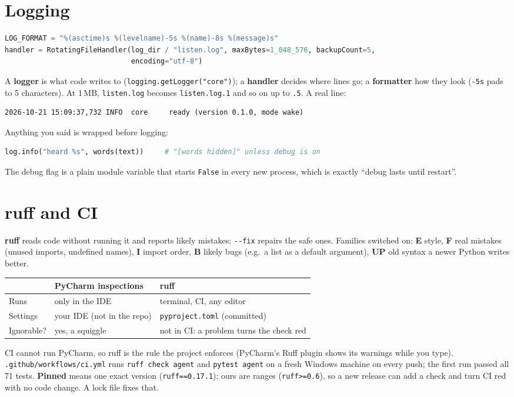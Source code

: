 \documentclass[11pt,a4paper]{article}
\begin{document}
\section{Logging}
\begin{lstlisting}[language=Python]
LOG_FORMAT = "%(asctime)s %(levelname)-5s %(name)-8s %(message)s"
handler = RotatingFileHandler(log_dir / "listen.log", maxBytes=1_048_576, backupCount=5,
                              encoding="utf-8")
\end{lstlisting}
\noindent A \textbf{logger} is what code writes to (\texttt{logging.getLogger("core")}); a
\textbf{handler} decides where lines go; a \textbf{formatter} how they look (\texttt{-5s} pads to 5
characters). At 1\,MB, \texttt{listen.log} becomes \texttt{listen.log.1} and so on up to
\texttt{.5}. A real line:
\begin{lstlisting}
2026-10-21 15:09:37,732 INFO  core     ready (version 0.1.0, mode wake)
\end{lstlisting}
\noindent Anything you said is wrapped before logging:
\begin{lstlisting}[language=Python]
log.info("heard %s", words(text))     # "[words hidden]" unless debug is on
\end{lstlisting}
\noindent The debug flag is a plain module variable that starts \texttt{False} in every new
process, which is exactly ``debug lasts until restart''.

\section{ruff and CI}
\textbf{ruff} reads code without running it and reports likely mistakes; \texttt{-{}-fix} repairs
the safe ones. Families switched on: \textbf{E} style, \textbf{F} real mistakes (unused imports,
undefined names), \textbf{I} import order, \textbf{B} likely bugs (e.g.\ a list as a default
argument), \textbf{UP} old syntax a newer Python writes better.
\begin{center}
\begin{tabularx}{\textwidth}{l X X}
\toprule
& \textbf{PyCharm inspections} & \textbf{ruff} \\
\midrule
Runs & only in the IDE & terminal, CI, any editor \\
Settings & your IDE (not in the repo) & \texttt{pyproject.toml} (committed) \\
Ignorable? & yes, a squiggle & not in CI: a problem turns the check red \\
\bottomrule
\end{tabularx}
\end{center}
\noindent CI cannot run PyCharm, so ruff is the rule the project enforces (PyCharm's Ruff plugin
shows its warnings while you type). \texttt{.github/workflows/ci.yml} runs \texttt{ruff check agent}
and \texttt{pytest agent} on a fresh Windows machine on every push; the first run passed all 71
tests. \textbf{Pinned} means one exact version (\texttt{ruff==0.17.1}); ours are ranges
(\texttt{ruff>=0.6}), so a new release can add a check and turn CI red with no code change. A lock
file fixes that.
\end{document}
